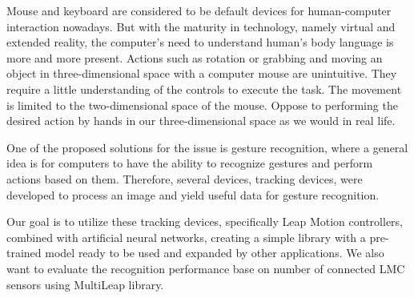 Mouse and keyboard are considered to be default devices for human-computer interaction nowadays. But with the maturity in technology, namely virtual and extended reality, the computer's need to understand human's body language is more and more present. Actions such as rotation or grabbing and moving an object in three-dimensional space with a computer mouse are unintuitive. They require a little understanding of the controls to execute the task. The movement is limited to the two-dimensional space of the mouse. Oppose to performing the desired action by hands in our three-dimensional space as we would in real life.

One of the proposed solutions for the issue is gesture recognition, where a general idea is for computers to have the ability to recognize gestures and perform actions based on them. Therefore, several devices, tracking devices, were developed to process an image and yield useful data for gesture recognition.

Our goal is to utilize these tracking devices, specifically Leap Motion controllers, combined with artificial neural networks, creating a simple library with a pre-trained model ready to be used and expanded by other applications. We also want to evaluate the recognition performance base on number of connected LMC sensors using MultiLeap library.